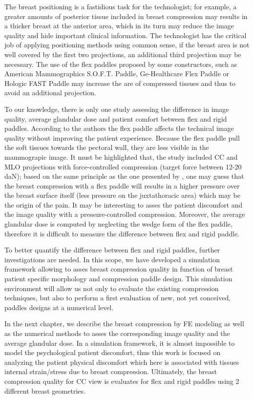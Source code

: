 The breast positioning is a fastidious task for the technologist; for example, a greater amounts of posterior tissue included in breast compression may results in a thicker breast at the anterior area, which in its turn may reduce the image quality and hide important clinical information. The technologist has the critical job of applying positioning methods using common sense, if the breast area is not well covered by the first two projections,  an additional third projection may be necessary. The use of the flex paddles proposed by some constructors, such as American Mammographics S.O.F.T. Paddle, Ge-Healthcare Flex Paddle or Hologic FAST Paddle may increase the are of compressed tissues and thus to avoid an additional projection.

To our knowledge, there is only one study assessing the difference in image quality, average glandular dose and patient comfort between flex and rigid paddles. According to the authors the flex paddle affects the technical image quality without improving the patient experience.  Because the flex paddle pull the soft tissues towards the pectoral wall, they are less visible in the mammograpic image. It must be highlighted that, the study included CC and MLO projections with force-controlled compression (target force between 12-20 daN); based on the same principle as the one presented by \cite{dustler_effect_2012}, one may guess that the breast compression with a flex paddle will results in a higher pressure over the breast surface itself (less pressure on the juxtathoracic area) which may be the origin of the pain. It may be interesting to asses the patient discomfort and the image quality with a pressure-controlled compression. Moreover, the average glandular dose is computed by neglecting the wedge form  of the flex paddle, therefore it is difficult to measure the difference between flex and rigid paddle.  

To better quantify the difference between flex and rigid paddles, further investigations are needed.  In this scope, we have developed a simulation framework allowing to asses breast compression quality in function of breast patient specific morphology and compression paddle design. This simulation environment will allow us not only to evaluate the existing compression techniques, but also to perform a first evaluation of new, not yet conceived, paddles designs at a numerical level. 

In the next chapter, we describe the breast compression by FE modeling as well as the numerical  methods to asses the corresponding image quality and the average glandular dose. In a simulation framework, it is almost impossible to model the psychological patient discomfort, thus this work is focused on analyzing the patient physical discomfort which here is associated with tissues internal strain/stress due to breast compression. Ultimately,  the breast compression quality for CC view is evaluates for flex and  rigid paddles using 2 different breast geometries. 